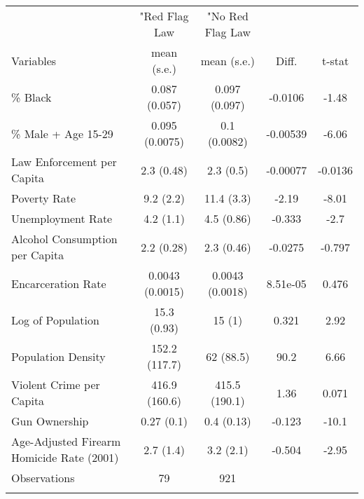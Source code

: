 \begin{tabular}{lcccc}
 &  &  &  & \tabularnewline
\hline
\hline
 &  "Red Flag Law & "No Red Flag Law \tabularnewline
Variables & mean (s.e.) & mean (s.e.) & Diff. & t-stat \tabularnewline
\hline
\% Black & 0.087 (0.057) & 0.097 (0.097) & -0.0106 & -1.48 \tabularnewline
\% Male + Age 15-29 & 0.095 (0.0075) & 0.1 (0.0082) & -0.00539 & -6.06 \tabularnewline
Law Enforcement per Capita & 2.3 (0.48) & 2.3 (0.5) & -0.00077 & -0.0136 \tabularnewline
Poverty Rate & 9.2 (2.2) & 11.4 (3.3) & -2.19 & -8.01 \tabularnewline
Unemployment Rate & 4.2 (1.1) & 4.5 (0.86) & -0.333 & -2.7 \tabularnewline
Alcohol Consumption per Capita & 2.2 (0.28) & 2.3 (0.46) & -0.0275 & -0.797 \tabularnewline
Encarceration Rate & 0.0043 (0.0015) & 0.0043 (0.0018) & 8.51e-05 & 0.476 \tabularnewline
Log of Population & 15.3 (0.93) & 15 (1) & 0.321 & 2.92 \tabularnewline
Population Density & 152.2 (117.7) & 62 (88.5) & 90.2 & 6.66 \tabularnewline
Violent Crime per Capita & 416.9 (160.6) & 415.5 (190.1) & 1.36 & 0.071 \tabularnewline
Gun Ownership & 0.27 (0.1) & 0.4 (0.13) & -0.123 & -10.1 \tabularnewline
Age-Adjusted Firearm Homicide Rate (2001) & 2.7 (1.4) & 3.2 (2.1) & -0.504 & -2.95 \tabularnewline
Observations & 79 & 921 &  &  \tabularnewline
\hline
\hline
 &  &  &  & \tabularnewline
\end{tabular}
